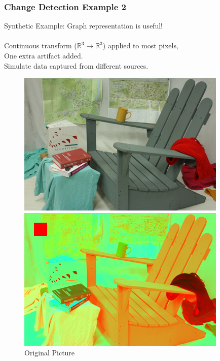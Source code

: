 \documentclass{beamer}
\begin{document}

\begin{frame}
  \frametitle{Change Detection Example 2}
  Synthetic Example: Graph representation is useful!\\~\\
  Continuous transform ($\mathbb{R}^3 \to \mathbb{R}^3$) applied to most pixels,\\
  One extra artifact added.\\
  Simulate data captured from different sources.
  \begin{figure}[ht]
    \centering
    \begin{minipage}[b]{0.32\linewidth}
      \centering
      \includegraphics[width=\textwidth]{./Images/ChangeDetect/ChairArtifact/pictureX.png}
      \caption{Original Picture}
    \end{minipage}
    \hfill
    \begin{minipage}[b]{0.32\linewidth}
      \centering
      \includegraphics[width=\textwidth]{./Images/ChangeDetect/ChairArtifact/pictureY.png}

\end{minipage}
\end{figure}
\end{frame}
\end{document}
